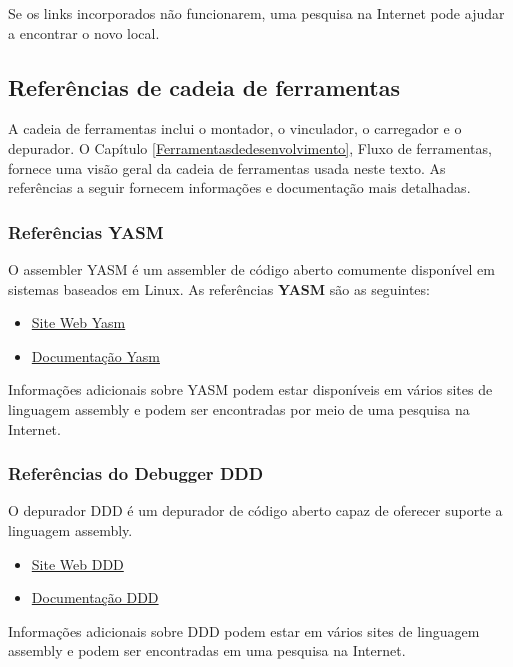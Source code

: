 Se os links incorporados não funcionarem, uma pesquisa na Internet pode ajudar a encontrar o novo local.

\subsection{Referências de cadeia de ferramentas}
A cadeia de ferramentas inclui o montador, o vinculador, o carregador e o depurador. O Capítulo \ref*{Ferramentasdedesenvolvimento}, Fluxo de ferramentas, fornece uma visão geral da cadeia de ferramentas usada neste texto. As referências a seguir fornecem informações e documentação mais detalhadas.

\subsubsection{Referências YASM}
O assembler YASM é um assembler de código aberto comumente disponível em sistemas baseados em Linux. As referências \textbf{YASM} são as seguintes:
\begin{itemize}
	\item \href{http://yasm.tortall.net/}{Site Web Yasm}
	\item \href{http://yasm.tortall.net/Guide.html}{Documentação Yasm}
\end{itemize}
Informações adicionais sobre YASM podem estar disponíveis em vários sites de linguagem assembly e podem ser encontradas por meio de uma pesquisa na Internet.

\subsubsection{Referências do Debugger DDD}
O depurador DDD é um depurador de código aberto capaz de oferecer suporte a linguagem assembly.
\begin{itemize}
	\item \href{http://www.gnu.org/software/ddd/}{Site Web DDD}
	\item \href{http://www.gnu.org/software/ddd/manual/}{Documentação DDD}
\end{itemize}
Informações adicionais sobre DDD podem estar em vários sites de linguagem assembly e podem ser encontradas em uma pesquisa na Internet.

